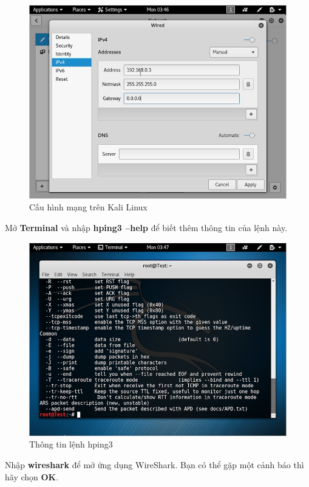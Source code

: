 \begin{figure}[!htb]
    \centering
    \includegraphics[width=0.85\linewidth]{figure//chapter5//lab5_2/network-linux.png}
    \caption{Cấu hình mạng trên Kali Linux}
    \label{fig:enter-label}
\end{figure}

 Mở \textbf{Terminal} và nhập \textbf{hping3 --help} để biết thêm thông tin của lệnh này.

\begin{figure}[!htb]
    \centering
    \includegraphics[width=0.8\linewidth]{figure//chapter5//lab5_2/hping3_info.png}
    \caption{Thông tin lệnh hping3}
    \label{fig:enter-label}
\end{figure}

 Nhập \textbf{wireshark} để mở ứng dụng WireShark. Bạn có thể gặp một cảnh báo thì hãy chọn \textbf{OK}.

